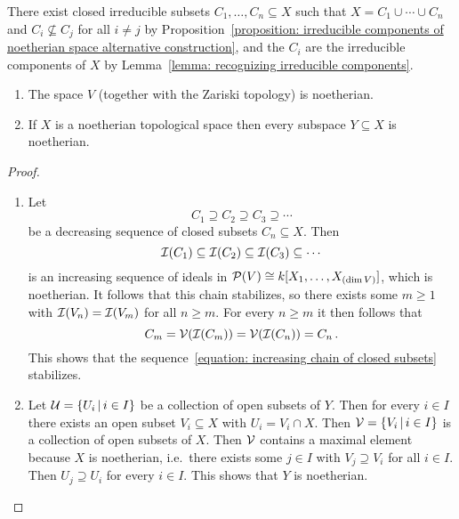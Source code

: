 \begin{corollary}
  There exist closed irreducible subsets $C_1, \dotsc, C_n \subseteq X$ such that $X = C_1 \cup \dotsb \cup C_n$ and $C_i \nsubseteq C_j$ for all $i \neq j$ by Proposition~\ref{proposition: irreducible components of noetherian space alternative construction}, and the $C_i$ are the irreducible components of $X$ by Lemma~\ref{lemma: recognizing irreducible components}.
\end{corollary}


\begin{lemma}
  \label{lemma: algebraic spaces are noetherian}
  \leavevmode
  \begin{enumerate}
    \item
      The space $V$ (together with the Zariski topology) is noetherian.
    \item
      If $X$ is a noetherian topological space then every subspace $Y \subseteq X$ is noetherian.
  \end{enumerate}
\end{lemma}


\begin{proof}
  \leavevmode
  \begin{enumerate}
    \item
      Let
      \begin{equation}
      \label{equation: increasing chain of closed subsets}
                  C_1
        \supseteq C_2
        \supseteq C_3
        \supseteq \dotsb
      \end{equation}
      be a decreasing sequence of closed subsets $C_n \subseteq X$.
      Then
      \[
                  \mathcal{I}(C_1)
        \subseteq \mathcal{I}(C_2)
        \subseteq \mathcal{I}(C_3)
        \subseteq \dotsb
      \]
      is an increasing sequence of ideals in $\mathcal{P}(V) \cong k[X_1, \dotsc, X_{(\dim V)}]$, which is noetherian.
      It follows that this chain stabilizes, so there exists some $m \geq 1$ with $\mathcal{I}(V_n) = \mathcal{I}(V_m)$ for all $n \geq m$.
      For every $n \geq m$ it then follows that
      \[
          C_m
        = \mathcal{V}(\mathcal{I}(C_m))
        = \mathcal{V}(\mathcal{I}(C_n))
        = C_n \,.
      \]
      This shows that the sequence~\eqref{equation: increasing chain of closed subsets} stabilizes.
    \item
      Let $\mc{U} = \{U_i \suchthat i \in I\}$ be a collection of open subsets of $Y$.
      Then for every $i \in I$ there exists an open subset $V_i \subseteq X$ with $U_i = V_i \cap X$.
      Then $\mc{V} = \{V_i \suchthat i \in I\}$ is a collection of open subsets of $X$.
      Then $\mathcal{V}$ contains a maximal element because $X$ is noetherian, i.e.\ there exists some $j \in I$ with $V_j \supseteq V_i$ for all $i \in I$.
      Then $U_j \supseteq U_i$ for every $i \in I$.
      This shows that $Y$ is noetherian.
    \qedhere
  \end{enumerate}  
\end{proof}


